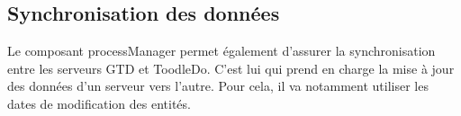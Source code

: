 \subsection*{Synchronisation des données}
Le composant processManager permet également d'assurer la synchronisation entre les serveurs GTD et ToodleDo. C'est lui qui prend en charge la mise à jour des données d'un serveur vers l'autre. Pour cela, il va notamment utiliser les dates de modification des entités.
